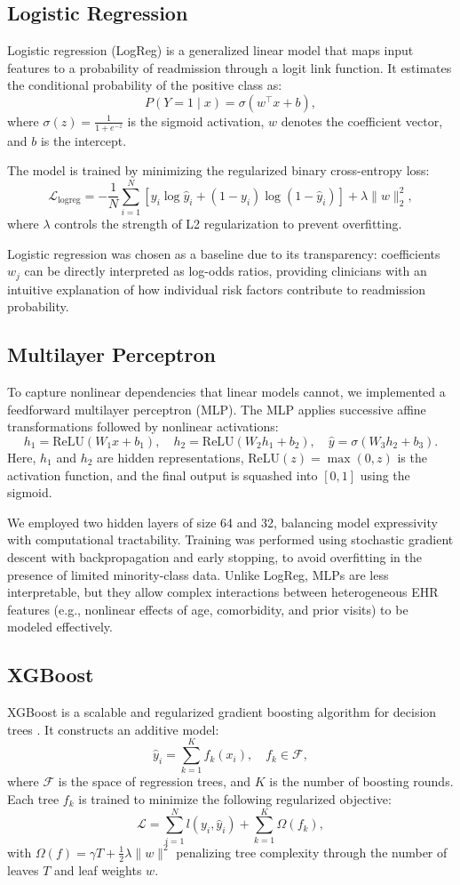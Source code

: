 \documentclass{article}
\begin{document}
\subsection{Logistic Regression}
Logistic regression (LogReg) is a generalized linear model that maps input features to a probability of readmission through a logit link function. It estimates the conditional probability of the positive class as:
\[
P(Y=1 \mid x) = \sigma(w^\top x + b),
\]
where $\sigma(z) = \frac{1}{1+e^{-z}}$ is the sigmoid activation, $w$ denotes the coefficient vector, and $b$ is the intercept.  

The model is trained by minimizing the regularized binary cross-entropy loss:
\[
\mathcal{L}_{\text{logreg}} = - \frac{1}{N}\sum_{i=1}^N \left[ y_i \log \hat{y}_i + (1-y_i)\log(1-\hat{y}_i)\right] + \lambda \|w\|_2^2,
\]
where $\lambda$ controls the strength of L2 regularization to prevent overfitting.  

Logistic regression was chosen as a baseline due to its transparency: coefficients $w_j$ can be directly interpreted as log-odds ratios, providing clinicians with an intuitive explanation of how individual risk factors contribute to readmission probability.

\subsection{Multilayer Perceptron}
To capture nonlinear dependencies that linear models cannot, we implemented a feedforward multilayer perceptron (MLP). The MLP applies successive affine transformations followed by nonlinear activations:
\[
h_1 = \text{ReLU}(W_1x+b_1), \quad h_2 = \text{ReLU}(W_2h_1+b_2), \quad \hat{y} = \sigma(W_3h_2+b_3).
\]
Here, $h_1$ and $h_2$ are hidden representations, ReLU$(z) = \max(0,z)$ is the activation function, and the final output is squashed into $[0,1]$ using the sigmoid.  

We employed two hidden layers of size 64 and 32, balancing model expressivity with computational tractability. Training was performed using stochastic gradient descent with backpropagation and early stopping, to avoid overfitting in the presence of limited minority-class data. Unlike LogReg, MLPs are less interpretable, but they allow complex interactions between heterogeneous EHR features (e.g., nonlinear effects of age, comorbidity, and prior visits) to be modeled effectively.

\subsection{XGBoost}
XGBoost is a scalable and regularized gradient boosting algorithm for decision trees \cite{chen2016xgboost}. It constructs an additive model:
\[
\hat{y}_i = \sum_{k=1}^K f_k(x_i), \quad f_k \in \mathcal{F},
\]
where $\mathcal{F}$ is the space of regression trees, and $K$ is the number of boosting rounds. Each tree $f_k$ is trained to minimize the following regularized objective:
\[
\mathcal{L} = \sum_{i=1}^N l(y_i, \hat{y}_i) + \sum_{k=1}^K \Omega(f_k),
\]
with $\Omega(f) = \gamma T + \tfrac{1}{2}\lambda \|w\|^2$ penalizing tree complexity through the number of leaves $T$ and leaf weights $w$.  
\end{document}
